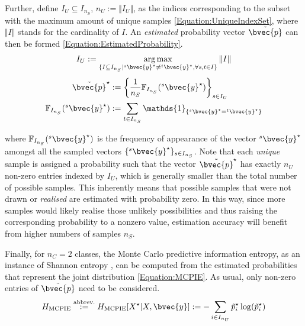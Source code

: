 			Further, define $I_{U} \subseteq I_{n_{S}}$, $n_{U} := \Vert I_{U} \Vert$, as the indices corresponding to the subset with the maximum amount of unique samples \eqref{Equation:UniqueIndexSet}, where $\Vert I \Vert$  stands for the cardinality of $I$. An \textit{estimated} probability vector $\tilde{\bvec{p}}$ can then be formed \eqref{Equation:EstimatedProbability}. \begin{equation}
				I_{U} := \argmax_{\{I \subseteq I_{n_{S}} | {^{s}}\bvec{y}^{\star} \neq {^{t}}\bvec{y}^{\star}, \forall s, t \in I\}} \Vert I \Vert 
			\label{Equation:UniqueIndexSet}
			\end{equation} \begin{equation}
				\begin{aligned}
					\tilde{\bvec{p}}^{\star} &:= \bigg\{ \frac{1}{n_{S}}\mathbb{F}_{I_{n_{S}}}({^{s}}\bvec{y}^{\star}) \bigg\}_{s \in I_{U}} \\
					\mathbb{F}_{I_{n_{S}}}({^{s}}\bvec{y}^{\star}) &:= \sum_{t \in I_{n_{S}}} \mathds{1}_{\{{^{s}}\bvec{y}^{\star} = {^{t}}\bvec{y}^{\star}\}}
				\end{aligned}
			\label{Equation:EstimatedProbability}
			\end{equation}
			
			where $\mathbb{F}_{I_{n_{S}}}({^{s}}\bvec{y}^{\star})$ is the frequency of appearance of the vector ${^{s}}\bvec{y}^{\star}$ amongst all the sampled vectors $\{ {^{s}}\bvec{y}^{\star} \}_{s \in I_{n_{S}}}$. Note that each \textit{unique} sample is assigned a probability such that the vector $\tilde{\bvec{p}}^{\star}$ has exactly $n_{U}$ non-zero entries indexed by $I_{U}$, which is generally smaller than the total number of possible samples. This inherently means that possible samples that were not drawn or \textit{realised} are estimated with probability zero. In this way, since more samples would likely realise those unlikely possibilities and thus raising the corresponding probability to a nonzero value, estimation accuracy will benefit from higher numbers of samples $n_{S}$.
			
			Finally,  for $n_{C} = 2$ classes, the Monte Carlo predictive information entropy, as an instance of Shannon entropy \cite{ShannonEntropy}, can be computed from the estimated probabilities that represent the joint distribution \eqref{Equation:MCPIE}. As usual, only non-zero entries of $\tilde{\bvec{p}}$ need to be considered. \begin{equation}
				H_{\mathrm{MCPIE}} \stackrel{\text{abbrev.}}{:=} H_{\mathrm{MCPIE}}[X^{\star} | X, \bvec{y}] := - \sum_{i \in I_{n_{U}}} \tilde{p}^{\star}_{i} \log(\tilde{p}^{\star}_{i})
			\label{Equation:MCPIE}
			\end{equation}		
			
